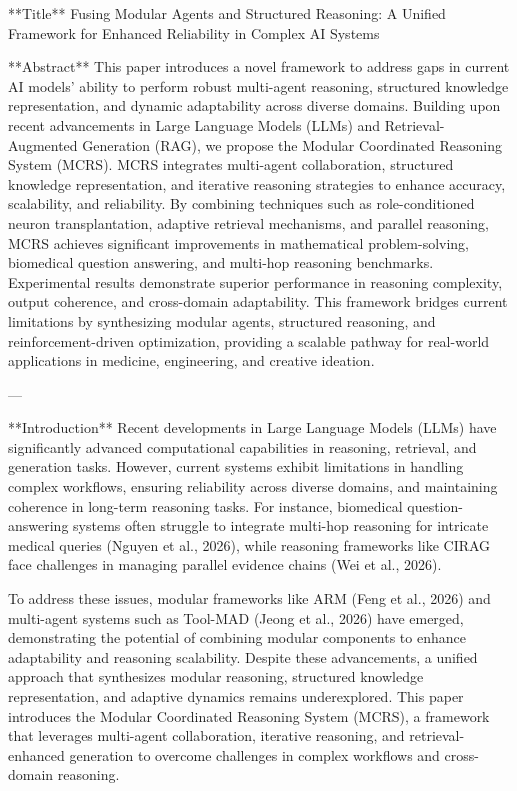 **Title**  
Fusing Modular Agents and Structured Reasoning: A Unified Framework for Enhanced Reliability in Complex AI Systems  

**Abstract**  
This paper introduces a novel framework to address gaps in current AI models’ ability to perform robust multi-agent reasoning, structured knowledge representation, and dynamic adaptability across diverse domains. Building upon recent advancements in Large Language Models (LLMs) and Retrieval-Augmented Generation (RAG), we propose the Modular Coordinated Reasoning System (MCRS). MCRS integrates multi-agent collaboration, structured knowledge representation, and iterative reasoning strategies to enhance accuracy, scalability, and reliability. By combining techniques such as role-conditioned neuron transplantation, adaptive retrieval mechanisms, and parallel reasoning, MCRS achieves significant improvements in mathematical problem-solving, biomedical question answering, and multi-hop reasoning benchmarks. Experimental results demonstrate superior performance in reasoning complexity, output coherence, and cross-domain adaptability. This framework bridges current limitations by synthesizing modular agents, structured reasoning, and reinforcement-driven optimization, providing a scalable pathway for real-world applications in medicine, engineering, and creative ideation.

---

**Introduction**  
Recent developments in Large Language Models (LLMs) have significantly advanced computational capabilities in reasoning, retrieval, and generation tasks. However, current systems exhibit limitations in handling complex workflows, ensuring reliability across diverse domains, and maintaining coherence in long-term reasoning tasks. For instance, biomedical question-answering systems often struggle to integrate multi-hop reasoning for intricate medical queries (Nguyen et al., 2026), while reasoning frameworks like CIRAG face challenges in managing parallel evidence chains (Wei et al., 2026).

To address these issues, modular frameworks like ARM (Feng et al., 2026) and multi-agent systems such as Tool-MAD (Jeong et al., 2026) have emerged, demonstrating the potential of combining modular components to enhance adaptability and reasoning scalability. Despite these advancements, a unified approach that synthesizes modular reasoning, structured knowledge representation, and adaptive dynamics remains underexplored. This paper introduces the Modular Coordinated Reasoning System (MCRS), a framework that leverages multi-agent collaboration, iterative reasoning, and retrieval-enhanced generation to overcome challenges in complex workflows and cross-domain reasoning.

